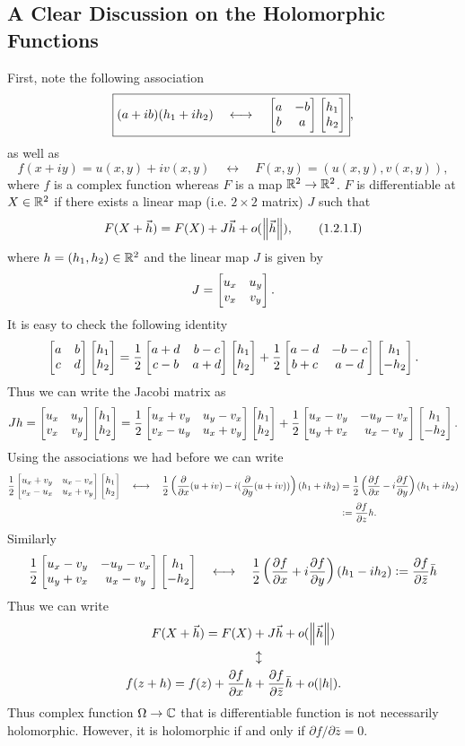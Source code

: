 \subsection{A Clear Discussion on the Holomorphic Functions}
First, note the following association
\[ \boxed{(a+ ib)(h_1+ih_2) \quad \longleftrightarrow\quad \begin{bmatrix} a & -b \\ b & a \end{bmatrix}\begin{bmatrix} h_1 \\ h_2 \end{bmatrix}},  \]
as well as
\[ \boxed{f(x+iy) = u(x,y) + iv(x,y) \quad\longleftrightarrow\quad F(x,y)=(u(x,y),v(x,y))}, \]
where $ f $ is a complex function whereas $ F $ is a map $ \mathbb{R}^2 \to \mathbb{R}^2 $. $ F $ is differentiable at $ X \in \mathbb{R}^2 $ if there exists a linear map (i.e. $ 2\times2 $ matrix) $ J $ such that 
\[ F(X+\vec{h}) = F(X) + J \vec{h} + o(\norm{\vec{h}}), \tag{1.2.1.I}\]
where $ h = (h_1,h_2) \in\mathbb{R}^2 $ and the linear map $ J $ is given by
\[ J = \begin{bmatrix} u_x & u_y \\ v_x & v_y \end{bmatrix}. \] 
It is easy to check the following identity
\[ \begin{bmatrix} a & b \\ c & d \end{bmatrix} \begin{bmatrix} h_1 \\ h_2 \end{bmatrix} = \frac{1}{2}\begin{bmatrix} a+d & b-c \\ c-b & a+d \end{bmatrix}\begin{bmatrix} h_1 \\ h_2 \end{bmatrix} + \frac{1}{2}\begin{bmatrix} a-d & -b-c \\ b+c & a-d \end{bmatrix}\begin{bmatrix} h_1 \\ -h_2 \end{bmatrix}. \]
Thus we can write the Jacobi matrix as
\[ Jh = \begin{bmatrix} u_x & u_y \\ v_x & v_y \end{bmatrix}\begin{bmatrix} h_1 \\ h_2 \end{bmatrix} = \frac12\begin{bmatrix} u_x+v_y & u_y-v_x \\ v_x-u_y & u_x+v_y \end{bmatrix}\begin{bmatrix} h_1 \\ h_2 \end{bmatrix} + \frac12\begin{bmatrix} u_x-v_y & -u_y-v_x \\ u_y+v_x & u_x-v_y \end{bmatrix}\begin{bmatrix} h_1 \\ -h_2 \end{bmatrix}. \]
Using the associations we had before we can write
\begin{align*}
	\frac12\begin{bmatrix} u_x+v_y & u_x-v_x \\ v_x-u_x & u_x+v_y \end{bmatrix}\begin{bmatrix} h_1 \\ h_2 \end{bmatrix} \quad\longleftrightarrow \quad \frac12\left(\frac{\partial}{\partial x}(u+iv) - i(\frac{\partial }{\partial y}(u + iv))\right)(h_1+ih_2) &= \frac12\left(\frac{\partial f}{\partial x} -i \frac{\partial f}{\partial y}\right)(h_1+ih_2)\\ 
	& := \frac{\partial f}{\partial z} h .
\end{align*}
Similarly
\begin{align*}
	\frac12\begin{bmatrix} u_x-v_y & -u_y-v_x \\ u_y+v_x & u_x-v_y \end{bmatrix}\begin{bmatrix} h_1 \\ -h_2 \end{bmatrix}
	\quad \longleftrightarrow \quad
	\frac12\left( \frac{\partial f}{\partial x} + i \frac{\partial f}{\partial y} \right) (h_1 - i h_2) := \frac{\partial f}{\partial \bar{z}} \bar{h}
\end{align*}
Thus we can write
\begin{align*}
	 F(X+\vec{h}) = F(X) &+ J \vec{h} + o(\norm{\vec{h}}) \\ 
	 &\updownarrow \\
	 f(z+h) = f(z) + \frac{\partial f}{\partial x} h &+ \frac{\partial f}{\partial \bar{z}}\bar{h} + o(|h|).
\end{align*}
Thus complex function $ \Omega\to \mathbb{C} $ that is differentiable function is not necessarily holomorphic. However, it is holomorphic if and only if $ \partial f/\partial\bar{z} = 0 $.

